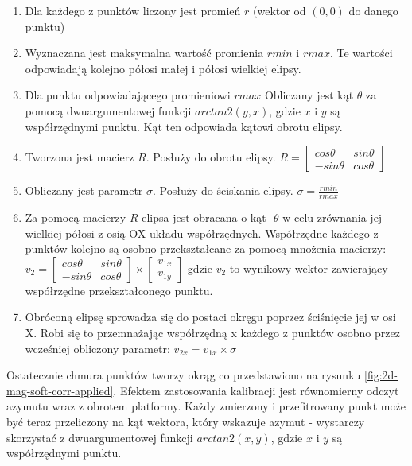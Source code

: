 \begin{enumerate}
    \item Dla każdego z punktów liczony jest promień $r$ (wektor od $(0,0)$ do danego punktu)
    \item Wyznaczana jest maksymalna wartość promienia $rmin$ i $rmax$. Te wartości odpowiadają kolejno półosi małej i półosi wielkiej elipsy.
    \item Dla punktu odpowiadającego promieniowi $rmax$ Obliczany jest kąt $\theta$ za pomocą dwuargumentowej funkcji $arctan2(y,x)$, gdzie $x$ i $y$ są współrzędnymi punktu. Kąt ten odpowiada kątowi obrotu elipsy.
    \item Tworzona jest macierz $R$. Posłuży do obrotu elipsy.
    $R = \begin{bmatrix}
            cos\theta & sin\theta\\
            -sin\theta & cos\theta
        \end{bmatrix}$
    \item Obliczany jest parametr $\sigma$. Posłuży do ściskania elipsy. $\sigma = \frac{rmin}{rmax}$
    \item Za pomocą macierzy $R$ elipsa jest obracana o kąt -$\theta$ w celu zrównania jej wielkiej półosi z osią OX układu współrzędnych. Współrzędne każdego z punktów kolejno są osobno przekształcane za pomocą mnożenia macierzy:
    $   
        \mathit{v}_{2}
        =
        \begin{bmatrix}
            cos\theta & sin\theta\\
            -sin\theta & cos\theta
        \end{bmatrix}
        \times
        \begin{bmatrix}
            \mathit{v}_{1x}\\
            \mathit{v}_{1y}
        \end{bmatrix}
    $
    gdzie $\mathit{v}_{2}$ to wynikowy wektor zawierający współrzędne przekształconego punktu.
    \item Obróconą elipsę sprowadza się do postaci okręgu poprzez ściśnięcie jej w osi X. Robi się to przemnażając współrzędną x każdego z punktów osobno przez wcześniej obliczony parametr: $\mathit{v}_{2x} = \mathit{v}_{1x} \times \sigma$
\end{enumerate}

Ostatecznie chmura punktów tworzy okrąg co przedstawiono na rysunku \ref{fig:2d-mag-soft-corr-applied}. Efektem zastosowania kalibracji jest równomierny odczyt azymutu wraz z obrotem platformy. Każdy zmierzony i przefitrowany punkt może być teraz przeliczony na kąt wektora, który wskazuje azymut - wystarczy skorzystać z dwuargumentowej funkcji $arctan2(x,y)$, gdzie $x$ i $y$ są współrzędnymi punktu.

